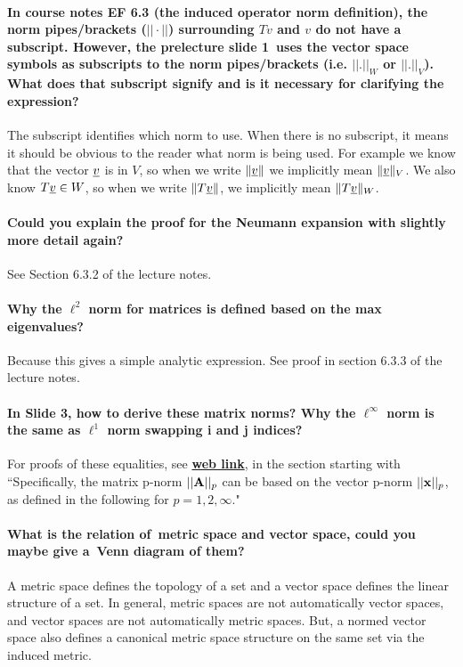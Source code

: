 \documentclass[10pt,english]{article}
\begin{document}
\paragraph{In course notes EF 6.3 (the induced operator norm definition), the norm pipes/brackets ($||\cdot||$) surrounding $Tv$ and $v$ do not have a subscript. However, the prelecture slide 1 uses the vector space symbols as subscripts to the norm pipes/brackets (i.e. $|| . ||_{W}$ or $|| . ||_{V}$). What does that subscript signify and is it necessary for clarifying the expression?}
The subscript identifies which norm to use.
When there is no subscript, it means it should be obvious to the reader what norm is being used. For example we know that the vector $\underline{v}$ is in $V$, so when we write $\| \underline{v} \|$ we implicitly mean $\|\underline{v}\|_V$.
We also know $T \underline{v} \in W$, so when we write $\|T\underline{v}\|$, we implicitly mean $\|T\underline{v}\|_W$.

\paragraph{Could you explain the proof for the Neumann expansion with slightly more detail again?}
See Section 6.3.2 of the lecture notes.

\paragraph{Why the $\ell^2$ norm for matrices is defined based on the max eigenvalues?}
Because this gives a simple analytic expression.  See proof in section 6.3.3 of the lecture notes.

\paragraph{In Slide 3, how to derive these matrix norms? Why the $\ell^{\infty}$ norm is the same as $\ell^1$ norm swapping i and j indices?}

For proofs of these equalities, see \href{https://www.cs.utexas.edu/users/flame/Notes/NotesOnNorms.pdf}{\textbf{web link}}, in the section starting with ``Specifically, the matrix p-norm $\vert\vert{\bf A}\vert\vert _p$ can be based on the vector p-norm $\vert\vert{\bf x}\vert\vert _p$, as defined in the following for  $p=1, 2, \infty$."

\paragraph{What is the relation of metric space and vector space, could you maybe give a Venn diagram of them?}
A metric space defines the topology of a set and a vector space defines the linear structure of a set.
In general, metric spaces are not automatically vector spaces, and vector spaces are not automatically metric spaces.
But, a normed vector space also defines a canonical metric space structure on the same set via the induced metric.
\end{document}
